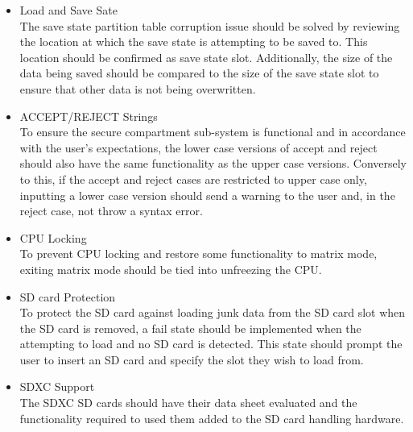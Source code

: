 \begin{itemize}
\item{Load and Save Sate}\\
  The save state partition table corruption issue should be solved by reviewing the location at which the save state is attempting to be saved to. 
  This location should be confirmed as save state slot. 
  Additionally, the size of the data being saved should be compared to the size of the save state slot to ensure that other data is not being overwritten.
\item{ACCEPT/REJECT Strings}\\
  To ensure the secure compartment sub-system is functional and in accordance with the user's expectations, the lower case versions of accept and reject should also have the same functionality as the upper case versions. 
  Conversely to this, if the accept and reject cases are restricted to upper case only, inputting a lower case version should send a warning to the user and, in the reject case, not throw a syntax error.
\item{CPU Locking}\\
  To prevent CPU locking and restore some functionality to matrix mode, exiting matrix mode should be tied into unfreezing the CPU.
\item{SD card Protection}\\
  To protect the SD card against loading junk data from the SD card slot when the SD card is removed, a fail state should be implemented when the attempting to load and no SD card is detected. This state should prompt the user to insert an SD card and specify the slot they wish to load from.
\item{SDXC Support}\\
  The SDXC SD cards should have their data sheet evaluated and the functionality required to used them added to the SD card handling hardware.
\end{itemize}

